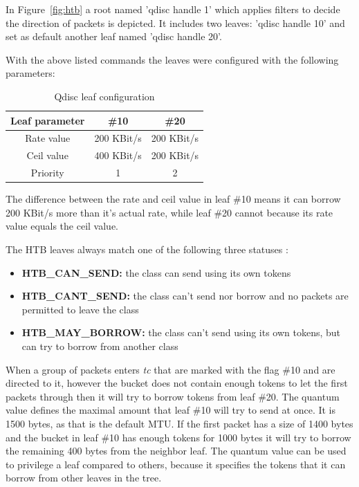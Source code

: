 In Figure~\ref{fig:htb} a root named 'qdisc handle 1' which applies filters to decide the direction of packets is depicted. It includes two leaves: 'qdisc handle 10' and set as default another leaf named 'qdisc handle 20'.

With the above listed commands the leaves were configured with the following parameters:

\begin{table}[H]
\centering

\begin{tabular}{|c|c|c|}
\hline Leaf parameter & \#10 & \#20 \\ 
\hline Rate value & 200 KBit/s & 200 KBit/s \\ 
\hline Ceil value & 400 KBit/s & 200 KBit/s \\ 
\hline Priority & 1 & 2 \\ 
\hline 
\end{tabular} 

\caption{Qdisc leaf configuration}
\end{table}

The difference between the rate and ceil value in leaf \#10 means it can borrow 200 KBit/s more than it's actual rate, while leaf \#20 cannot because its rate value equals the ceil value.

The HTB leaves always match one of the following three statuses \cite{htb-qdiscs}:
\begin{itemize}
\item \textbf{HTB\_CAN\_SEND:} the class can send using its own tokens
\item \textbf{HTB\_CANT\_SEND:} the class can't send nor borrow and no packets are permitted to leave the class
\item \textbf{HTB\_MAY\_BORROW:} the class can't send using its own tokens, but can try to borrow from another class
\end{itemize}

When a group of packets enters \textit{tc} that are marked with the flag \#10 and are directed to it, however the bucket does not contain enough tokens to let the first packets through then it will try to borrow tokens from leaf \#20. The quantum value defines the maximal amount that leaf \#10 will try to send at once. It is 1500 bytes, as that is the default MTU. If the first packet has a size of 1400 bytes and the bucket in leaf \#10 has enough tokens for 1000 bytes it will try to borrow the remaining 400 bytes from the neighbor leaf. The quantum value can be used to privilege a leaf compared to others, because it specifies the tokens that it can borrow from other leaves in the tree.

